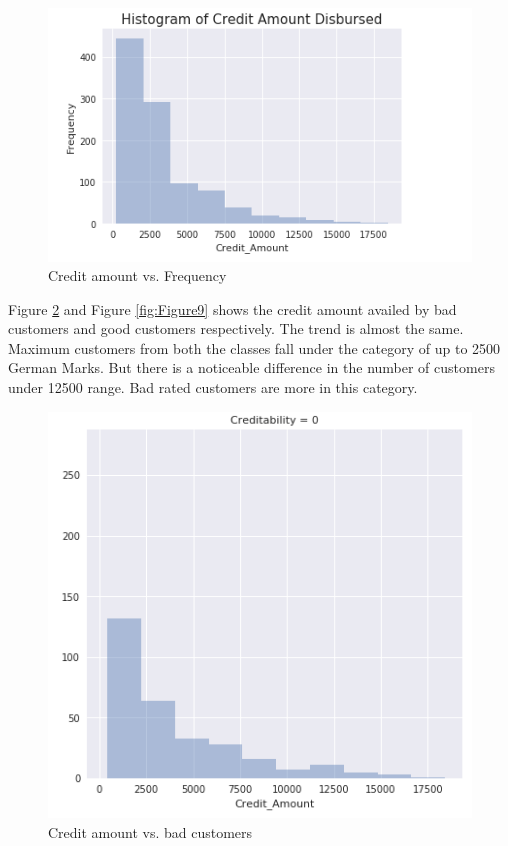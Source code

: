 \documentclass[sigconf]{acmart}
\begin{document}
\begin{figure}[htb]
  \centering
  \includegraphics[width=1.0\columnwidth]{images/Figure7.png}
  \caption{Credit amount vs. Frequency
  \cite{german-credit-sri-sai}}
  \label{fig:Figure7} 
\end{figure}

Figure \ref{fig:Figure8} and Figure \ref{fig:Figure9} shows the credit amount availed by bad customers and good customers respectively. The trend is almost the same. Maximum customers from both the classes fall under the category of up to 2500 German Marks. But there is a noticeable difference in the number of customers under 12500 range. Bad rated customers are more in this category.

\begin{figure}[htb]
  \centering
  \includegraphics[width=1.0\columnwidth]{images/Figure8.png}
  \caption{Credit amount vs. bad customers
  \cite{german-credit-sri-sai}}
  \label{fig:Figure8} 
\end{figure}
\end{document}

